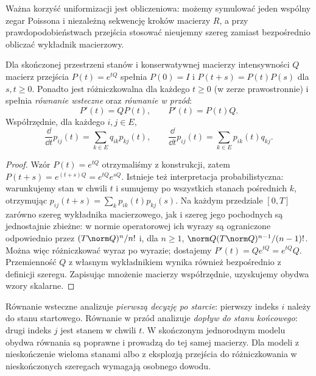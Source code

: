 Ważna korzyść uniformizacji jest obliczeniowa: możemy
symulować jeden wspólny zegar Poissona i niezależną sekwencję
kroków macierzy $R$, a przy prawdopodobieństwach przejścia
stosować nieujemny szereg zamiast bezpośrednio obliczać
wykładnik macierzowy.

\begin{twierdzenie}
\label{thm:kolmogorov-eq}
Dla skończonej przestrzeni stanów i konserwatywnej macierzy
intensywności $Q$ macierz przejścia $P(t)=e^{tQ}$ spełnia
$P(0)=I$ i $P(t+s)=P(t)P(s)$ dla $s,t\ge0$. Ponadto
jest różniczkowalna dla każdego $t\ge0$ (w zerze prawostronnie)
i spełnia \emph{równanie wsteczne} oraz \emph{równanie w przód}:
\[
P'(t)=QP(t),\qquad P'(t)=P(t)Q.
\]
Współrzędnie, dla każdego $i,j\in E$,
\[
\frac{\dd}{\dd t}p_{ij}(t)=\sum_{k\in E}q_{ik}p_{kj}(t),
\qquad
\frac{\dd}{\dd t}p_{ij}(t)=\sum_{k\in E}p_{ik}(t)q_{kj}.
\]
\end{twierdzenie}
\begin{proof}
Wzór $P(t)=e^{tQ}$ otrzymaliśmy z konstrukcji, zatem
$P(t+s)=e^{(t+s)Q}=e^{tQ}e^{sQ}$.
Istnieje też interpretacja probabilistyczna: warunkujemy
stan w chwili $t$ i sumujemy po wszystkich stanach
pośrednich $k$, otrzymując
$p_{ij}(t+s)=\sum_kp_{ik}(t)p_{kj}(s)$.
Na każdym przedziale $[0,T]$ zarówno szereg wykładnika
macierzowego, jak i szereg jego pochodnych są jednostajnie
zbieżne: w normie operatorowej ich wyrazy są ograniczone
odpowiednio przez $(T\norm Q)^n/n!$ i, dla $n\ge1$,
$\norm Q(T\norm Q)^{n-1}/(n-1)!$.
Można więc różniczkować wyraz po wyrazie; dostajemy
$P'(t)=Qe^{tQ}=e^{tQ}Q$.
Przemienność $Q$ z własnym wykładnikiem wynika również
bezpośrednio z definicji szeregu.
Zapisując mnożenie macierzy współrzędnie, uzyskujemy
obydwa wzory skalarne.
\end{proof}

\begin{uwaga}
Równanie wsteczne analizuje \emph{pierwszą decyzję po starcie}:
pierwszy indeks $i$ należy do stanu startowego.
Równanie w przód analizuje \emph{dopływ do stanu końcowego}:
drugi indeks $j$ jest stanem w chwili $t$.
W skończonym jednorodnym modelu obydwa równania są poprawne
i prowadzą do tej samej macierzy. Dla modeli z nieskończenie
wieloma stanami albo z eksplozją przejścia do różniczkowania
w nieskończonych szeregach wymagają osobnego dowodu.
\end{uwaga}


